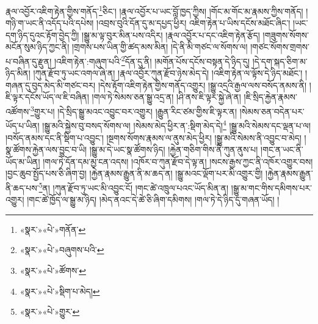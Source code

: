 རྣལ་འབྱོར་འཇིག་རྟེན་གྱིས་གནོད་\footnote{«སྣར་»«པེ་»གནོན་}ཅིང་། །རྣལ་འབྱོར་པ་ཡང་བློ་ཁྱད་ཀྱིས། །གོང་མ་གོང་མ་རྣམས་ཀྱིས་གནོད། །གཉི་ག་ཡང་ནི་འདོད་པའི་དཔེས། །འབྲས་བུའི་དོན་དུ་མ་དཔྱད་ཕྱིར། འཇིག་རྟེན་པ་ཡིས་དངོས་མཐོང་ཞིང་། །ཡང་དག་ཉིད་དུའང་རྟོག་བྱེད་ཀྱི། །སྒྱུ་མ་ལྟ་བུར་མིན་པས་འདིར། །རྣལ་འབྱོར་པ་དང་འཇིག་རྟེན་རྩོད། །གཟུགས་སོགས་མངོན་སུམ་ཉིད་ཀྱང་ནི། །གྲགས་པས་ཡིན་གྱི་ཚད་མས་མིན། །དེ་ནི་མི་གཙང་ལ་སོགས་ལ། །གཙང་སོགས་གྲགས་པ་བཞིན་དུ་རྫུན། །འཇིག་རྟེན་:གཞུག་པའི་\footnote{«སྣར་»«པེ་»བཞུགས་པའི་}དོན་དུ་ནི། །མགོན་པོས་དངོས་བསྟན་དེ་ཉིད་དུ། །དེ་དག་སྐད་ཅིག་མ་ཉིད་མིན། །ཀུན་རྫོབ་ཏུ་ཡང་འགལ་ཞེ་ན། །རྣལ་འབྱོར་ཀུན་རྫོབ་ཉེས་མེད་དེ། །འཇིག་རྟེན་ལ་ལྟོས་དེ་ཉིད་མཐོང་། །གཞན་དུ་བུད་མེད་མི་གཙང་བར། །དེས་རྟོག་འཇིག་རྟེན་གྱིས་གནོད་འགྱུར། །སྒྱུ་འདྲའི་རྒྱལ་ལས་བསོད་ནམས་ནི། །ཇི་ལྟར་དངོས་ཡོད་ལ་ཇི་བཞིན། །གལ་ཏེ་སེམས་ཅན་སྒྱུ་འདྲ་ན། །ཤི་ནས་ཇི་ལྟར་སྐྱེ་ཞེ་ན། །ཇི་སྲིད་རྐྱེན་རྣམས་འཚོགས་\footnote{«སྣར་»«པེ་»ཚོགས་}གྱུར་པ། །དེ་སྲིད་སྒྱུ་མའང་འབྱུང་བར་འགྱུར། །རྒྱུན་རིང་ཙམ་གྱིས་ཇི་ལྟར་ན། །སེམས་ཅན་བདེན་པར་ཡོད་པ་ཡིན། །སྒྱུ་མའི་སྐྱེས་བུ་བསད་སོགས་ལ། །སེམས་མེད་ཕྱིར་ན་:སྡིག་མེད་དེ།\footnote{«སྣར་»«པེ་»སྡིག་པ་མེད།} །སྒྱུ་མའི་སེམས་དང་ལྡན་པ་ལ། །བསོད་ནམས་དང་ནི་སྡིག་པ་འབྱུང་། །སྔགས་སོགས་རྣམས་ལ་ནུས་མེད་ཕྱིར། །སྒྱུ་མའི་སེམས་ནི་འབྱུང་བ་མེད། །སྣ་ཚོགས་རྐྱེན་ལས་བྱུང་བ་ཡི། །སྒྱུ་མ་དེ་ཡང་སྣ་ཚོགས་ཉིད། །རྐྱེན་གཅིག་གིས་ནི་ཀུན་ནུས་པ། །གང་ན་ཡང་ནི་ཡོད་མ་ཡིན། །གལ་ཏེ་དོན་དམ་མྱ་ངན་འདས། །འཁོར་བ་ཀུན་རྫོབ་དེ་ལྟ་ན། །སངས་རྒྱས་ཀྱང་ནི་འཁོར་འགྱུར་བས། །བྱང་ཆུབ་སྤྱོད་པས་ཅི་ཞིག་བྱ། །རྐྱེན་རྣམས་རྒྱུན་ནི་མ་ཆད་ན། །སྒྱུ་མའང་ལྡོག་པར་མི་འགྱུར་གྱི། །རྐྱེན་རྣམས་རྒྱུན་ནི་ཆད་པས་\footnote{«སྣར་»«པེ་»གྱུར་}ན། །ཀུན་རྫོབ་ཏུ་ཡང་མི་འབྱུང་ངོ། །གང་ཚེ་འཁྲུལ་པའང་ཡོད་མིན་ན། །སྒྱུ་མ་གང་གིས་དམིགས་པར་འགྱུར། །གང་ཚེ་ཁྱོད་ལ་སྒྱུ་མ་ཉིད། །མེད་ནའང་དེ་ཚེ་ཅི་ཞིག་དམིགས། །གལ་ཏེ་དེ་ཉིད་དུ་གཞན་ཡོད། །
